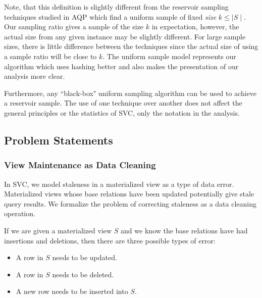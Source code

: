 Note, that this definition is slightly different from the reservoir sampling techniques studied in AQP \cite{DBLP:journals/toms/Vitter85} which find a uniform sample of fixed \emph{size} $k\le \mid S \mid$.
Our sampling ratio gives a sample of the size $k$ in expectation, however, the actual size from any given instance may be slightly different.
For large sample sizes, there is little difference between the techniques since the actual size of using a sample ratio will be close to $k$.
The uniform sample model represents our algorithm which uses hashing better and also makes the presentation of our analysis more clear.

Furthermore, any ``black-box" uniform sampling algorithm can be used to achieve a reservoir sample.
The use of one technique over another does not affect the general principles or the statistics of SVC, only the 
notation in the analysis.

\subsection{Problem Statements}
\subsubsection{View Maintenance as Data Cleaning}
In SVC, we model staleness in a materialized view as a type of data error.
Materialized views whose base relations have been updated potentially give stale query results.
We formalize the problem of correcting staleness as a data cleaning operation.

If we are given a materialized view $S$ and we know the base relations have had insertions and deletions, then there are three possible types of error:
\begin{itemize}
\item A row in $S$ needs to be updated.
\item A row in $S$ needs to be deleted.
\item A new row needs to be inserted into $S$.
\end{itemize}

